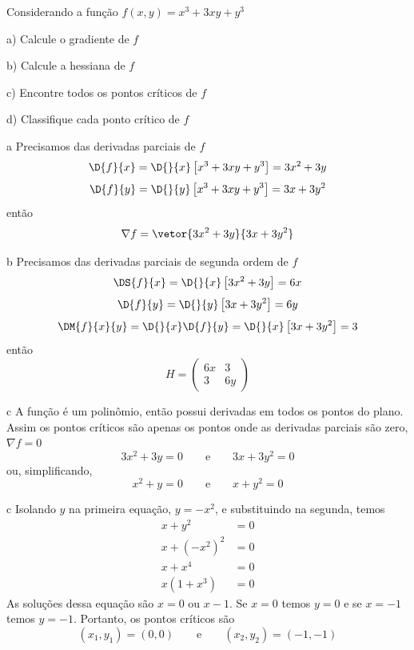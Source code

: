 \begin{question}
  Considerando a função
  \(
    f(x, y) = x^3 + 3xy + y^3
  \)

  a) Calcule o gradiente de $f$

  b) Calcule a hessiana de $f$

  c) Encontre todos os pontos críticos de $f$

  d) Classifique cada ponto crítico de $f$
\end{question}

\begin{resolution}{a}
  Precisamos das derivadas parciais de $f$
  \[
    \D{f}{x}
    = \D{}{x}\left[x^3 + 3xy + y^3\right]
    = 3x^2 + 3y
  \]
  \[
    \D{f}{y}
    = \D{}{y}\left[x^3 + 3xy + y^3\right]
    = 3x + 3y^2
  \]
  então
  \[
    \nabla f = \vetor{3x^2 + 3y}{3x + 3y^2}
  \]
\end{resolution}

\begin{resolution}{b}
  Precisamos das derivadas parciais de segunda ordem de $f$
  \[
    \DS{f}{x}
    = \D{}{x}\left[3x^2 + 3y\right]
    = 6x
  \]
  \[
    \D{f}{y}
    = \D{}{y}\left[3x + 3y^2\right]
    = 6y
  \]
  \[
    \DM{f}{x}{y}
    = \D{}{x}\D{f}{y}
    = \D{}{x}\left[3x + 3y^2\right]
    = 3
  \]
  então
  \[
    H = \left(\begin{array}{cc}
      6x & 3 \\
      3 & 6y
    \end{array}\right)
  \]
\end{resolution}

\begin{resolution}{c}
  A função é um polinômio, então possui derivadas em todos os pontos do plano.
  Assim os pontos críticos são apenas os pontos onde as derivadas parciais são zero,
  \(\nabla f = 0\)
  \[
    3x^2 + 3y = 0
    \qquad\text{e}\qquad
    3x + 3y^2 = 0
  \]
  ou, simplificando,
  \[
    x^2 + y = 0
    \qquad\text{e}\qquad
    x + y^2 = 0
  \]
\end{resolution}

\begin{resolution}{c}
  Isolando $y$ na primeira equação, \(y = -x^2\), e substituindo na segunda, temos
  \begin{align*}
    x + y^2                 & = 0 \\
    x + \left(-x^2\right)^2 & = 0 \\
    x + x^4                 & = 0 \\
    x(1+ x^3)               & = 0
  \end{align*}
  As soluções dessa equação são $x=0$ ou $x-1$.
  Se $x=0$ temos $y=0$ e
  se $x=-1$ temos $y=-1$.
  Portanto, os pontos críticos são
  \[
    (x_1, y_1) = (0, 0)
    \qquad\text{e}\qquad
    (x_2, y_2) = (-1, -1)
  \]
\end{resolution}

